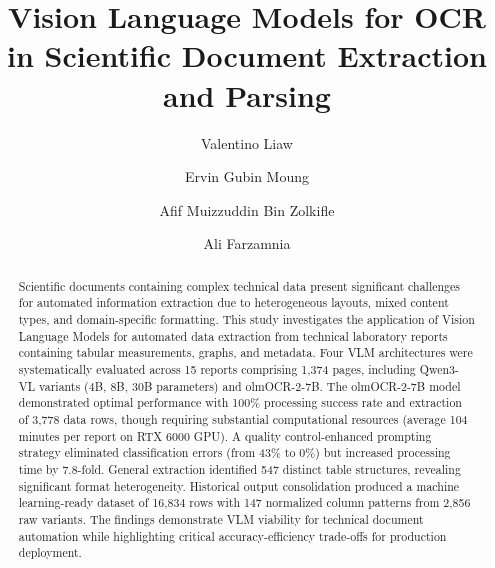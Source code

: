 \documentclass{svproc}
\begin{document}
\mainmatter

\title{Vision Language Models for OCR in Scientific Document Extraction and Parsing}


\author{Valentino Liaw \and Ervin Gubin Moung \and Afif Muizzuddin Bin Zolkifle \and Ali Farzamnia}




\maketitle

\begin{abstract}
Scientific documents containing complex technical data present significant challenges for automated information extraction due to heterogeneous layouts, mixed content types, and domain-specific formatting. This study investigates the application of Vision Language Models for automated data extraction from technical laboratory reports containing tabular measurements, graphs, and metadata. Four VLM architectures were systematically evaluated across 15 reports comprising 1,374 pages, including Qwen3-VL variants (4B, 8B, 30B parameters) and olmOCR-2-7B. The olmOCR-2-7B model demonstrated optimal performance with 100\% processing success rate and extraction of 3,778 data rows, though requiring substantial computational resources (average 104 minutes per report on RTX 6000 GPU). A quality control-enhanced prompting strategy eliminated classification errors (from 43\% to 0\%) but increased processing time by 7.8-fold. General extraction identified 547 distinct table structures, revealing significant format heterogeneity. Historical output consolidation produced a machine learning-ready dataset of 16,834 rows with 147 normalized column patterns from 2,856 raw variants. The findings demonstrate VLM viability for technical document automation while highlighting critical accuracy-efficiency trade-offs for production deployment.

\end{abstract}
\end{document}
